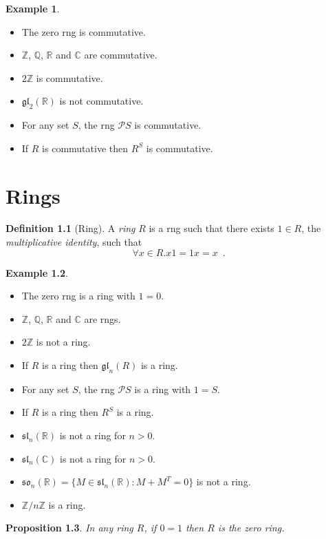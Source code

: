 \documentclass{book}
\newtheorem{prop}{Proposition}[chapter]
\theoremstyle{definition}
\newtheorem{df}[prop]{Definition}
\newtheorem{ex}[prop]{Example}
\newcommand{\gl}[2]{\ensuremath{\mathfrak{gl}_{#1} \left( {#2} \right)}}
\renewcommand{\sl}[2]{\ensuremath{\mathfrak{sl}_{#1} \left( {#2} \right)}}
\newcommand{\so}[2]{\ensuremath{\mathfrak{so}_{#1} \left( {#2} \right)}}
\begin{document}
\begin{ex}
\begin{itemize}
\item The zero rng is commutative.
\item $\mathbb{Z}$, $\mathbb{Q}$, $\mathbb{R}$ and $\mathbb{C}$ are commutative.
\item
$2 \mathbb{Z}$ is commutative.
\item $\gl{2}{\mathbb{R}}$ is not commutative.
\item For any set $S$, the rng $\mathcal{P} S$ is commutative.
\item If $R$ is commutative then $R^S$ is commutative.
\end{itemize}
\end{ex}

\chapter{Rings}

\begin{df}[Ring]
A \emph{ring} $R$ is a rng such that there exists $1 \in R$, the \emph{multiplicative identity}, such that
\[ \forall x \in R. x1 = 1x = x \enspace . \]
\end{df}

\begin{ex}
\begin{itemize}
\item The zero rng is a ring with $1 = 0$.
\item $\mathbb{Z}$, $\mathbb{Q}$, $\mathbb{R}$ and $\mathbb{C}$ are rngs.
\item $2 \mathbb{Z}$ is not a ring.
\item If $R$ is a ring then $\gl{n}{R}$ is a ring.
\item For any set $S$, the rng $\mathcal{P} S$ is a ring with $1 = S$.
\item If $R$ is a ring then $R^S$ is a ring.
\item $\sl{n}{\mathbb{R}}$ is not a ring for $n > 0$.
\item $\sl{n}{\mathbb{C}}$ is not a ring for $n > 0$.
\item $\so{n}{\mathbb{R}} = \{ M \in \sl{n}{\mathbb{R}} : M + M^T = 0 \}$ is not a ring.
\item $\mathbb{Z} / n \mathbb{Z}$ is a ring.
\end{itemize}
\end{ex}

\begin{prop}
In any ring $R$, if $0 = 1$ then $R$ is the zero ring.
\end{prop}
\end{document}
